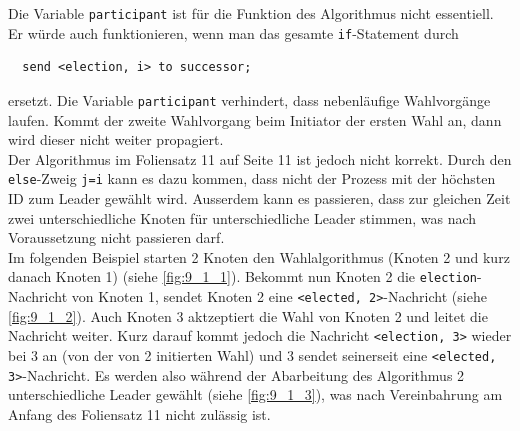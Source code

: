Die Variable \verb+participant+ ist für die Funktion des Algorithmus nicht
essentiell. Er würde auch funktionieren, wenn man das gesamte
\verb+if+-Statement durch 
\begin{verbatim}
  send <election, i> to successor;
\end{verbatim}
ersetzt.
Die Variable \verb+participant+ verhindert, dass nebenläufige Wahlvorgänge laufen. Kommt der zweite
Wahlvorgang beim Initiator der ersten Wahl an, dann wird dieser nicht weiter propagiert.
\\ \medskip
Der Algorithmus im Foliensatz 11 auf Seite 11 ist jedoch nicht korrekt. Durch den
\verb+else+-Zweig \verb+j=i+ kann es dazu kommen, dass nicht der Prozess mit der
höchsten ID zum Leader gewählt wird. Ausserdem kann es passieren, dass zur
gleichen Zeit zwei unterschiedliche Knoten für unterschiedliche Leader stimmen, was nach
Voraussetzung nicht passieren darf. \\
Im folgenden Beispiel starten 2 Knoten den Wahlalgorithmus (Knoten 2 und kurz
danach Knoten 1) (siehe \ref{fig:9_1_1}). Bekommt nun Knoten 2 die
\verb+election+-Nachricht von Knoten 1, sendet Knoten 2 eine \verb+<elected, 2>+-Nachricht 
(siehe \ref{fig:9_1_2}). Auch Knoten 3 aktzeptiert die Wahl von Knoten 2 und leitet die
Nachricht weiter. Kurz darauf kommt jedoch die Nachricht \verb+<election, 3>+ 
wieder bei 3 an (von der von 2 initierten Wahl) und 3 sendet seinerseit eine
\verb+<elected, 3>+-Nachricht. Es werden also während der Abarbeitung des Algorithmus 2 unterschiedliche Leader gewählt
(siehe \ref{fig:9_1_3}), was nach Vereinbahrung am Anfang des Foliensatz 11 nicht zulässig ist. 
